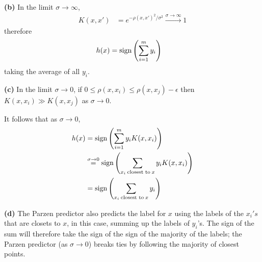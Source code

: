 \documentclass[a4paper, 12pt]{article}
\begin{document}
\begin{problem} [Problem 1]
\textbf{(b)} In the limit $\sigma \to \infty$, \begin{align*}
   K(x, x') &= e^{-\rho(x, x')^2/\sigma^2} \xrightarrow{\sigma \to \infty} 1
\end{align*}
therefore \begin{align*}
    h(x) &= \mathrm{sign}\left(\sum_{i=1}^{m} y_i\right)
\end{align*}
taking the average of all $y_i$.

\textbf{(c)} In the limit $\sigma \to 0$, if $0 \leq \rho(x, x_i) \leq  \rho(x, x_j) - \epsilon$ then $K(x, x_i) \gg K(x, x_j)$ as $\sigma \to 0$.

It follows that as $\sigma \to 0$, \begin{align*}
h(x) &= \mathrm{sign}\left(\sum_{i=1}^{m} y_i K(x, x_i)\right) \\
&\stackrel{\sigma \to 0}{=} \mathrm{sign}\left(\sum_{x_i \:\text{closest to}\: x} y_i K(x, x_i)\right) \\
&= \mathrm{sign}\left(\sum_{x_i \:\text{closest to}\: x} y_i\right)
\end{align*}

\textbf{(d)} The Parzen predictor also predicts the label for $x$ using the labels of the $x_i's$ that are closets to $x$, in this case, summing up the labels of $y_i$'s. The sign of the sum will therefore take the sign of the sign of the majority of the labels; the Parzen predictor (as $\sigma \to 0$) breaks ties by following the majority of closest points.


\end{problem}
\end{document}
